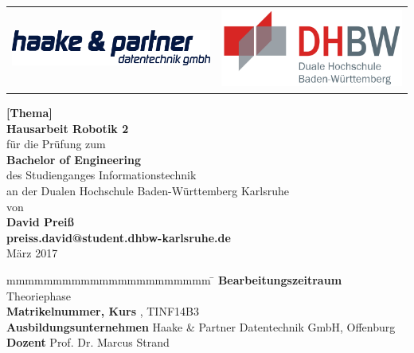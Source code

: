 \begin{titlepage}
	\begin{longtable}{p{} p{}}
		{\includegraphics[height=1.2cm]{bilder/logo}} &		
		{\includegraphics[height=2.6cm]{bilder/dhbw}}
	\end{longtable}
	\enlargethispage{20mm}
	\begin{center}
		\vspace*{12mm}	{\LARGE\bf [Thema] }\\
		\vspace*{12mm}	{\large\bf Hausarbeit Robotik 2}\\
		\vspace*{12mm}	für die Prüfung zum\\
		\vspace*{3mm}		{\bf Bachelor of Engineering}\\
    \vspace*{12mm}	des Studienganges Informationstechnik{} \\
    \vspace*{3mm}		an der Dualen Hochschule Baden-Württemberg Karlsruhe{} \\
		\vspace*{12mm}	von\\
		\vspace*{3mm}		{\large\bfseries David Preiß \\ preiss.david@student.dhbw-karlsruhe.de}\\ 
		\vspace*{12mm}	März 2017\\
	\end{center}
	\vfill
	\begin{spacing}{1.2}
	\begin{tabbing}
		mmmmmmmmmmmmmmmmmmmmmm            \= \kill
		\textbf{Bearbeitungszeitraum}       \>  Theoriephase\\
		\textbf{Matrikelnummer, Kurs}  , TINF14B3\\
		\textbf{Ausbildungsunternehmen}                  \>  Haake \& Partner Datentechnik GmbH, Offenburg\\
		\textbf{Dozent}               \>  Prof. Dr. Marcus Strand
	\end{tabbing}
	\end{spacing}
\end{titlepage}
